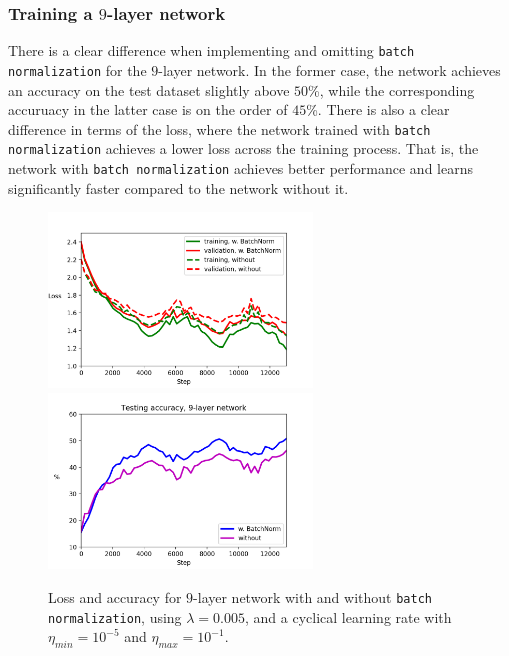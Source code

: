 \documentclass{article}
\begin{document}
\subsubsection*{Training a $9$-layer network}
	There is a clear difference when implementing and omitting \texttt{batch normalization} for the $9$-layer network. In the former case, the network achieves an accuracy on the test dataset slightly above $50$\%, while the corresponding accuruacy in the latter case is on the order of $45$\%. There is also a clear difference in terms of the loss, where the network trained with \texttt{batch normalization} achieves a lower loss across the training process. That is, the network with \texttt{batch normalization} achieves better performance and learns significantly faster compared to the network without it.
	\begin{figure}[h!]
		\centering
		\includegraphics[width=7cm]{../plots/loss_comp_9layer.png}
		\includegraphics[width=7cm]{../plots/acc_comp_9layer.png}
		\caption{Loss and accuracy for $9$-layer network with and without \texttt{batch normalization}, using $\lambda=0.005$, and a cyclical learning rate with $\eta_{min} = 10^{-5}$ and $\eta_{max} = 10^{-1}$.}
	\end{figure}

\newpage
\end{document}
